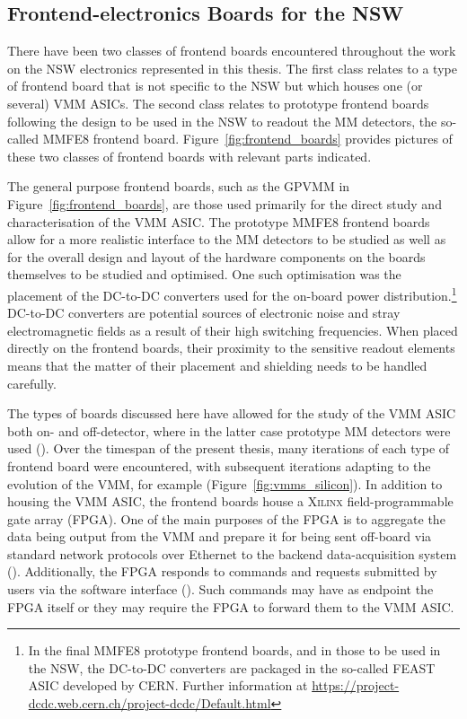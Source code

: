 \subsection{Frontend-electronics Boards for the NSW}
\label{sec:nsw_boards}

There have been two classes of frontend boards encountered
throughout the work on the NSW electronics represented in this thesis.
The first class relates to a type of frontend board that is not specific to the NSW
but which houses one (or several) VMM ASICs.
The second class relates to prototype frontend boards following the design to be used
in the NSW to readout the MM detectors, the so-called MMFE8 frontend board.
Figure~\ref{fig:frontend_boards} provides pictures of these two classes of frontend
boards with relevant parts indicated.

The general purpose frontend boards, such as the GPVMM in Figure~\ref{fig:frontend_boards}, are those used primarily for the direct study
and characterisation of the VMM ASIC.
The prototype MMFE8 frontend boards allow for a more realistic interface to the MM
detectors to be studied as well as for the overall design and layout of the hardware components on the
boards themselves to be studied and optimised.
One such optimisation was the placement of the DC-to-DC converters used for the on-board power distribution.\footnote{In the
final MMFE8 prototype frontend boards, and in those to be used in the NSW,
the DC-to-DC converters are packaged in the so-called FEAST ASIC developed by CERN.
Further information at \url{https://project-dcdc.web.cern.ch/project-dcdc/Default.html}}
DC-to-DC converters are potential sources of electronic noise and stray electromagnetic fields as a result of
their high switching frequencies.
When placed directly on the frontend boards, their proximity to the sensitive readout
elements means that the matter of their placement and shielding needs to be handled carefully.

The types of boards discussed here have allowed for the study of the VMM ASIC both on- and off-detector,
where in the latter case prototype MM detectors were used ({\color{red}{More to say in Section XXX}}).
Over the timespan of the present thesis, many iterations of each type of frontend board
were encountered, with subsequent iterations adapting to the evolution of the VMM, for example (Figure~\ref{fig:vmms_silicon}).
In addition to housing the VMM ASIC, the frontend boards house a
\textsc{Xilinx} field-programmable gate array (FPGA). 
One of the main purposes of the FPGA is to aggregate the data being output from the VMM
and prepare it for being sent off-board via standard network protocols over Ethernet to the
backend data-acquisition system ({\color{red}{Section XXX}}).
Additionally, the FPGA responds to commands and requests submitted by users via the software
interface ({\color{red}{Section XXX}}).
Such commands may have as endpoint the FPGA itself or they may require the FPGA to forward
them to the VMM ASIC.

